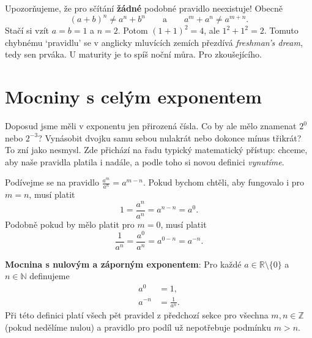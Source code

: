 \begin{definitionbox}
  Upozorňujeme, že pro sčítání \textbf{žádné} podobné pravidlo neexistuje! Obecně
  \begin{equation*}
    {(a + b)}^n \neq a^n + b^n \qquad\text{a}\qquad a^m + a^n \neq a^{m+n}.
  \end{equation*}
  Stačí si vzít $a = b = 1$ a $n = 2$. Potom ${(1 + 1)}^2 = 4$, ale $1^2 + 1^2 = 2$. Tomuto chybnému `pravidlu' se v anglicky mluvících zemích přezdívá \textit{freshman's dream}, tedy sen prváka. U maturity je to spíš noční můra. Pro zkoušejícího.
\end{definitionbox}

\section{Mocniny s celým exponentem}\label{sec:mocniny-cely}

Doposud jsme měli v exponentu jen přirozená čísla. Co by ale mělo znamenat $2^0$ nebo $2^{-3}$? Vynásobit dvojku samu sebou nulakrát nebo dokonce mínus třikrát? To zní jako nesmysl. Zde přichází na řadu typický matematický přístup: chceme, aby naše pravidla platila i nadále, a podle toho si novou definici \textit{vynutíme}.

Podívejme se na pravidlo $\frac{a^m}{a^n} = a^{m-n}$. Pokud bychom chtěli, aby fungovalo i pro $m = n$, musí platit
\begin{equation*}
  1 = \frac{a^n}{a^n} = a^{n-n} = a^0.
\end{equation*}
Podobně pokud by mělo platit pro $m = 0$, musí platit
\begin{equation*}
  \frac{1}{a^n} = \frac{a^0}{a^n} = a^{0-n} = a^{-n}.
\end{equation*}

\begin{definitionbox}
  \textbf{Mocnina s nulovým a záporným exponentem}: Pro každé $a\in\mathbb{R}\setminus\{0\}$ a $n\in\mathbb{N}$ definujeme
  \begin{align*}
    a^0 &= 1,\\
    a^{-n} &= \frac{1}{a^n}.
  \end{align*}
  Při této definici platí všech pět pravidel z předchozí sekce pro všechna $m, n\in\mathbb{Z}$ (pokud nedělíme nulou) a pravidlo pro podíl už nepotřebuje podmínku $m > n$.
\end{definitionbox}


